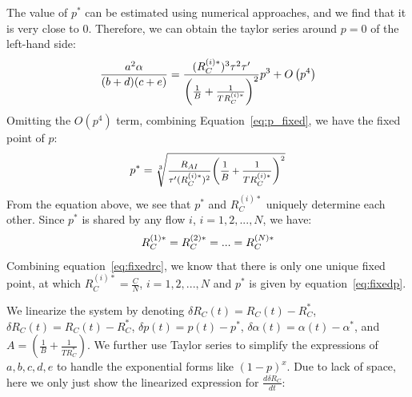 The value of $p^*$ can be estimated using numerical approaches, and we find that
it is very close to 0. Therefore, we can obtain the taylor series around $p=0$
of the left-hand side:
\begin{equation}
\small
\frac{{{a^2}\alpha }}{{(b + d)(c + e)}} = \frac{{(R_C^{(i)*})^3{\tau ^2}\tau '}}{{{{\left( {\frac{1}{B} + \frac{1}{{TR_C^{(i)*}}}} \right)}^2}}}{p^3} + O\left( {{p^4}} \right)
\end{equation}
Omitting the $O(p^4)$ term, combining Equation~\ref{eq:p_fixed}, we have the fixed point of $p$:
\begin{equation}
\small
{p^*} = \sqrt[3]{{\frac{{{R_{AI}}}}{{{\tau '}(R_C^{(i)*})^2}}{{\left( {\frac{1}{B} + \frac{1}{TR_C^{(i)*}}} \right)}^2}}}
\label{eq:fixedp}
\end{equation}
From the equation above, we see that $p^*$ and $R_C^{(i)*}$ uniquely determine each other. 
Since $p^*$ is shared by any flow $i$, $i = 1, 2, ..., N$, we have:
\begin{equation}
\small
R_C^{(1)*} = R_C^{(2)*} = ... = R_C^{(N)*}
\end{equation}
Combining equation~\ref{eq:fixedrc}, we know that there is only one unique fixed
point, at which $R_C^{(i)*} = \frac{C}{N}$, $i = 1, 2, ..., N$ and $p^*$ is
given by equation~\ref{eq:fixedp}.


We linearize the system by denoting $\delta {R_C}(t) = {R_C}(t) - R_C^*$,
$\delta {R_C}(t) = {R_C}(t) - R_C^*$, $\delta p(t) = p(t) - p^*$, $\delta \alpha
(t) = \alpha (t) - \alpha^*$, and $A = \left( {\frac{1}{B} + \frac{1}{{TR_C^*}}}
\right)$.  We further use Taylor series to simplify the expressions of $a, b, c,
d, e$ to handle the exponential forms like $(1-p)^x$.  Due to lack of space,
here we only just show the linearized expression for $\frac{{d\delta {R_C}}}{{dt}}$:

